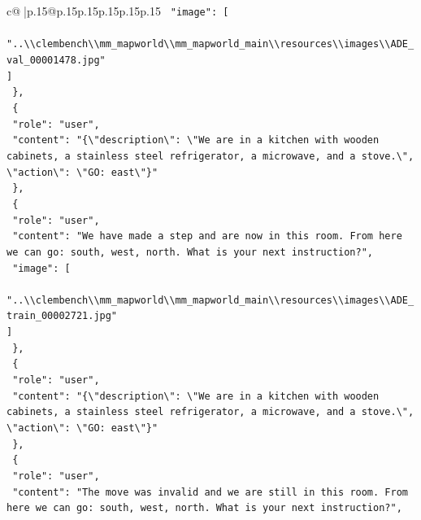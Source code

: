 \documentclass{article}
\begin{document}
{\begin{supertabular}{c@{$\;$}|p{.15\linewidth}@{}p{.15\linewidth}p{.15\linewidth}p{.15\linewidth}p{.15\linewidth}p{.15\linewidth}}
{{{\texttt{    "image": {[}} \\
\texttt{      "..\textbackslash{}\textbackslash{}clembench\textbackslash{}\textbackslash{}mm\_mapworld\textbackslash{}\textbackslash{}mm\_mapworld\_main\textbackslash{}\textbackslash{}resources\textbackslash{}\textbackslash{}images\textbackslash{}\textbackslash{}ADE\_val\_00001478.jpg"} \\
\texttt{    {]}} \\
\texttt{  \},} \\
\texttt{  \{} \\
\texttt{    "role": "user",} \\
\texttt{    "content": "\{\textbackslash{}"description\textbackslash{}": \textbackslash{}"We are in a kitchen with wooden cabinets, a stainless steel refrigerator, a microwave, and a stove.\textbackslash{}", \textbackslash{}"action\textbackslash{}": \textbackslash{}"GO: east\textbackslash{}"\}"} \\
\texttt{  \},} \\
\texttt{  \{} \\
\texttt{    "role": "user",} \\
\texttt{    "content": "We have made a step and are now in this room. From here we can go: south, west, north. What is your next instruction?",} \\
\texttt{    "image": {[}} \\
\texttt{      "..\textbackslash{}\textbackslash{}clembench\textbackslash{}\textbackslash{}mm\_mapworld\textbackslash{}\textbackslash{}mm\_mapworld\_main\textbackslash{}\textbackslash{}resources\textbackslash{}\textbackslash{}images\textbackslash{}\textbackslash{}ADE\_train\_00002721.jpg"} \\
\texttt{    {]}} \\
\texttt{  \},} \\
\texttt{  \{} \\
\texttt{    "role": "user",} \\
\texttt{    "content": "\{\textbackslash{}"description\textbackslash{}": \textbackslash{}"We are in a kitchen with wooden cabinets, a stainless steel refrigerator, a microwave, and a stove.\textbackslash{}", \textbackslash{}"action\textbackslash{}": \textbackslash{}"GO: east\textbackslash{}"\}"} \\
\texttt{  \},} \\
\texttt{  \{} \\
\texttt{    "role": "user",} \\
\texttt{    "content": "The move was invalid and we are still in this room. From here we can go: south, west, north. What is your next instruction?",} \\
}}}
\end{supertabular}}
\end{document}

